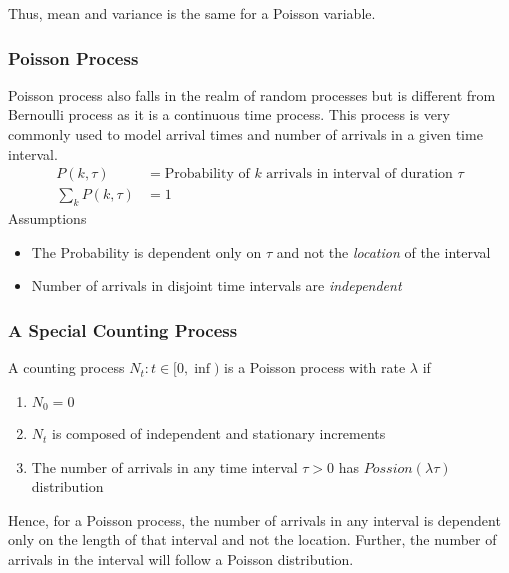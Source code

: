 \documentclass[../../probability-notes.tex]{subfiles}
\begin{document}
    Thus, mean and variance is the same for a Poisson variable.

    \subsubsection{Poisson Process}
    Poisson process also falls in the realm of random processes but is different from Bernoulli process as it is a continuous time process. This process is very commonly used to model arrival times and number of arrivals in a given time interval.
    \begin{align*}
        P(k, \tau) &= \text{Probability of $k$ arrivals in interval of duration $\tau$}\\
        \sum_{k} P(k, \tau) &= 1 \tag*{for a given $\tau$}
    \end{align*}
    Assumptions
    \begin{itemize}
        \item The Probability is dependent only on $\tau$ and not the \emph{location} of the interval
        \item Number of arrivals in disjoint time intervals are \emph{independent}
    \end{itemize}
    
    \subsubsection{A Special Counting Process}
    A counting process $N_{t}:t \in [0,\inf)$ is a Poisson process with rate $\lambda$ if
    \begin{enumerate}
        \item $N_{0} = 0$
        \item $N_{t}$ is composed of independent and stationary increments
        \item The number of arrivals in any time interval $\tau > 0$ has $Possion(\lambda \tau)$ distribution 
    \end{enumerate}
    Hence, for a Poisson process, the number of arrivals in any interval is dependent only on the length of that interval and not the location. Further, the number of arrivals in the interval will follow a Poisson distribution.
\end{document}
